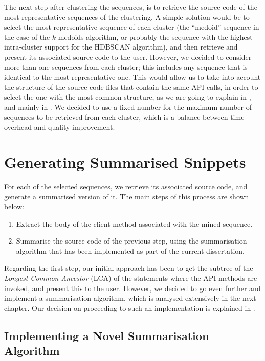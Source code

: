 The next step after clustering the sequences, is to retrieve the source code of the most representative sequences of the clustering. A simple solution would be to select the most representative sequence of each cluster (the ``medoid'' sequence in the case of the $k$-medoids algorithm, or probably the sequence with the highest intra-cluster support for the HDBSCAN algorithm), and then retrieve and present its associated source code to the user. However, we decided to consider more than one sequences from each cluster; this includes any sequence that is identical to the most representative one. This would allow us to take into account the structure of the source code files that contain the same API calls, in order to select the one with the most common structure, as we are going to explain in , and mainly in . We decided to use a fixed number for the maximum number of sequences to be retrieved from each cluster, which is a balance between time overhead and quality improvement.


\section{Generating Summarised Snippets}
\label{sec:snippet-generation}

For each of the selected sequences, we retrieve its associated source code, and generate a summarised version of it. The main steps of this process are shown below:

\begin{enumerate}
\item Extract the body of the client method associated with the mined sequence.
\item Summarise the source code of the previous step, using the summarisation algorithm that has been implemented as part of the current dissertation.
\end{enumerate} 

Regarding the first step, our initial approach has been to get the subtree of the \textit{Longest Common Ancestor} (LCA) of the statements where the API methods are invoked, and present this to the user. However, we decided to go even further and implement a summarisation algorithm, which is analysed extensively in the next chapter. Our decision on proceeding to such an implementation is explained in 
.


\subsection{Implementing a Novel Summarisation Algorithm}
\label{subsec:summarisation-algorithm-decision}

